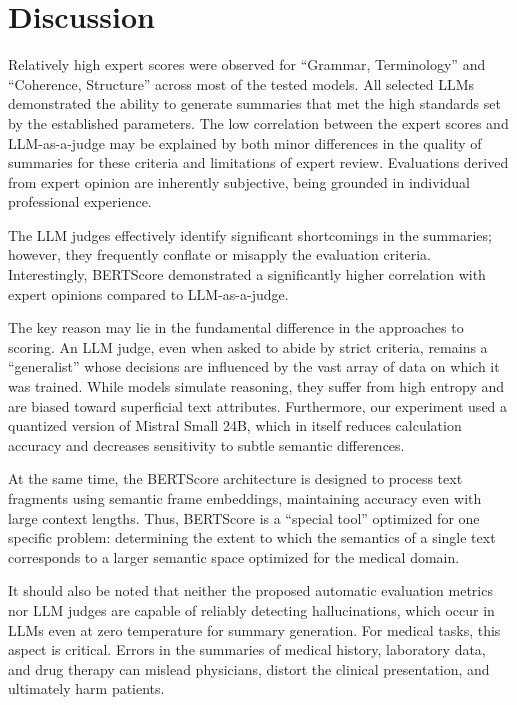 \documentclass[runningheads]{llncs}
\begin{document}
\section{Discussion}\label{sec:discussion}

Relatively high expert scores were observed for ``Grammar, Terminology'' and ``Coherence, Structure'' across most of the tested models. All selected LLMs demonstrated the ability to generate summaries that met the high standards set by the established parameters. The low correlation between the expert scores and LLM-as-a-judge may be explained by both minor differences in the quality of summaries for these criteria and limitations of expert review. Evaluations derived from expert opinion are inherently subjective, being grounded in individual professional experience.

The LLM judges effectively identify significant shortcomings in the summaries; however, they frequently conflate or misapply the evaluation criteria. Interestingly, BERTScore demonstrated a significantly higher correlation with expert opinions compared to LLM-as-a-judge.

The key reason may lie in the fundamental difference in the approaches to scoring. An LLM judge, even when asked to abide by strict criteria, remains a ``generalist'' whose decisions are influenced by the vast array of data on which it was trained. While models simulate reasoning, they suffer from high entropy and are biased toward superficial text attributes. Furthermore, our experiment used a quantized version of Mistral Small 24B, which in itself reduces calculation accuracy and decreases sensitivity to subtle semantic differences.

At the same time, the BERTScore architecture is designed to process text fragments using semantic frame embeddings, maintaining accuracy even with large context lengths. Thus, BERTScore is a ``special tool'' optimized for one specific problem: determining the extent to which the semantics of a single text corresponds to a larger semantic space optimized for the medical domain.

It should also be noted that neither the proposed automatic evaluation metrics nor LLM judges are capable of reliably detecting hallucinations, which occur in LLMs even at zero temperature for summary generation. For medical tasks, this aspect is critical. Errors in the summaries of medical history, laboratory data, and drug therapy can mislead physicians, distort the clinical presentation, and ultimately harm patients.
\end{document}

